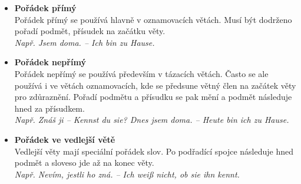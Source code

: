 \documentclass[12pt,a4paper]{report}
\begin{document}
\begin{itemize}
\item
\textbf{Pořádek přímý}\\
Pořádek přímý se používá hlavně v oznamovacích větách. Musí být dodrženo pořadí podmět, přísudek na začátku věty.\\
\textit{Např. Jsem doma. -- Ich bin zu Hause.}

\item
\textbf{Pořádek nepřímý}\\
Pořádek nepřímý se používá především v tázacích větách. Často se ale používá i ve větách oznamovacích, kde se předsune větný člen na začátek věty pro zdůraznění. Pořadí podmětu a přísudku se pak mění a podmět následuje hned za přísudkem.\\
\textit{Např. Znáš ji -- Kennst du sie? Dnes jsem doma. -- Heute bin ich zu Hause.}

\item
\textbf{Pořádek ve vedlejší větě}\\
Vedlejší věty mají speciální pořádek slov. Po podřadící spojce následuje hned podmět a sloveso jde až na konec věty.\\
\textit{Např. Nevím, jestli ho zná. -- Ich weiß nicht, ob sie ihn kennt.}
\end{itemize}
\end{document}
